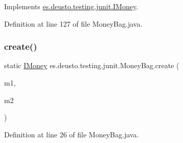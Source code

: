 Implements \mbox{\hyperlink{interfacees_1_1deusto_1_1testing_1_1junit_1_1_i_money_ae45bc758e69a0017f083f11d050c53cb}{es.\+deusto.\+testing.\+junit.\+I\+Money}}.



Definition at line 127 of file Money\+Bag.\+java.

\mbox{\label{classes_1_1deusto_1_1testing_1_1junit_1_1_money_bag_a8d2d54a342d2de2b75530600123efc9a}} 
\subsubsection{\texorpdfstring{create()}{create()}}
{\footnotesize\ttfamily static \mbox{\hyperlink{interfacees_1_1deusto_1_1testing_1_1junit_1_1_i_money}{I\+Money}} es.\+deusto.\+testing.\+junit.\+Money\+Bag.\+create (\begin{DoxyParamCaption}\item[{\mbox{\hyperlink{interfacees_1_1deusto_1_1testing_1_1junit_1_1_i_money}{I\+Money}}}]{m1,  }\item[{\mbox{\hyperlink{interfacees_1_1deusto_1_1testing_1_1junit_1_1_i_money}{I\+Money}}}]{m2 }\end{DoxyParamCaption})\hspace{0.3cm}{\ttfamily [static]}}



Definition at line 26 of file Money\+Bag.\+java.

